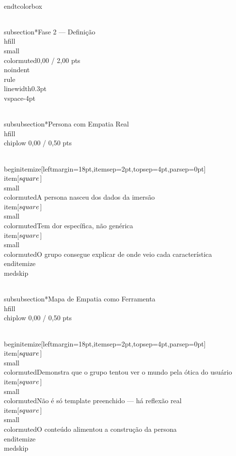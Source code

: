\documentclass[11pt, a4paper]{article}
\newcommand{\chiplow}[1]{\colorbox{crimsondim}{\color{crimson}\semibold\small\strut\ #1\ }}
\begin{document}
\\end{tcolorbox}

\\subsection*{Fase 2 — Definição \\hfill {\\small\\color{muted}0,00 / 2,00 pts}}
\\noindent\\rule{\\linewidth}{0.3pt}\\vspace{-4pt}

\\subsubsection*{Persona com Empatia Real \\hfill {\\chiplow 0,00 / 0,50 pts}}

\\begin{itemize}[leftmargin=18pt,itemsep=2pt,topsep=4pt,parsep=0pt]
  \\item[$\\square$] {\\small\\color{muted}A persona nasceu dos dados da imersão}
  \\item[$\\square$] {\\small\\color{muted}Tem dor específica, não genérica}
  \\item[$\\square$] {\\small\\color{muted}O grupo consegue explicar de onde veio cada característica}
\\end{itemize}
\\medskip

\\subsubsection*{Mapa de Empatia como Ferramenta \\hfill {\\chiplow 0,00 / 0,50 pts}}

\\begin{itemize}[leftmargin=18pt,itemsep=2pt,topsep=4pt,parsep=0pt]
  \\item[$\\square$] {\\small\\color{muted}Demonstra que o grupo tentou ver o mundo pela ótica do usuário}
  \\item[$\\square$] {\\small\\color{muted}Não é só template preenchido — há reflexão real}
  \\item[$\\square$] {\\small\\color{muted}O conteúdo alimentou a construção da persona}
\\end{itemize}
\\medskip
\end{document}
